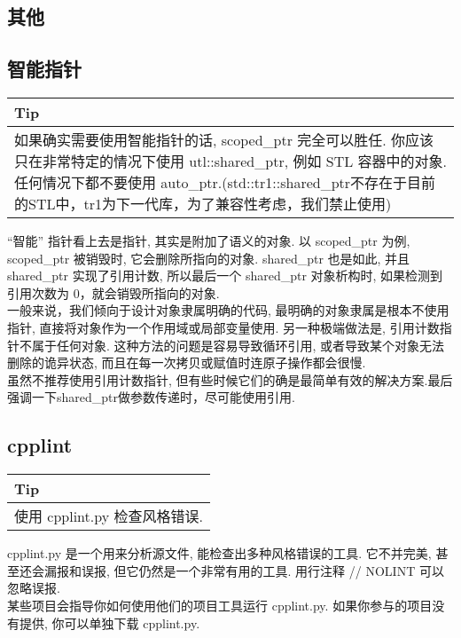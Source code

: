 \documentclass[a4paper,11pt,CJK]{article}
\begin{document}
\begin{CJK}{UTF8}{gbsn}
\newpage

\section{其他}
\subsection{智能指针}
\begin{table}[htbp]
\flushleft
\begin{tabular}{p{400pt}}
\toprule
\rowcolor[gray]{.8} Tip \\
\midrule
如果确实需要使用智能指针的话, scoped\_ptr 完全可以胜任. 你应该只在非常特定的情况下使用 utl::shared\_ptr, 例如 STL 容器中的对象. 任何情况下都不要使用 auto\_ptr.(std::tr1::shared\_ptr不存在于目前的STL中，tr1为下一代库，为了兼容性考虑，我们禁止使用)\\
\bottomrule
\end{tabular}
\end{table}
“智能” 指针看上去是指针, 其实是附加了语义的对象. 以 scoped\_ptr 为例, scoped\_ptr 被销毁时, 它会删除所指向的对象. shared\_ptr 也是如此, 并且 shared\_ptr 实现了引用计数, 所以最后一个 shared\_ptr 对象析构时, 如果检测到引用次数为 0，就会销毁所指向的对象.\\
一般来说，我们倾向于设计对象隶属明确的代码, 最明确的对象隶属是根本不使用指针, 直接将对象作为一个作用域或局部变量使用. 另一种极端做法是, 引用计数指针不属于任何对象. 这种方法的问题是容易导致循环引用, 或者导致某个对象无法删除的诡异状态, 而且在每一次拷贝或赋值时连原子操作都会很慢.\\
虽然不推荐使用引用计数指针, 但有些时候它们的确是最简单有效的解决方案.最后强调一下shared\_ptr做参数传递时，尽可能使用引用.

\subsection{cpplint}
\begin{table}[htbp]
\flushleft
\begin{tabular}{p{400pt}}
\toprule
\rowcolor[gray]{.8} Tip \\
\midrule
使用 cpplint.py 检查风格错误.\\
\bottomrule
\end{tabular}
\end{table}
cpplint.py 是一个用来分析源文件, 能检查出多种风格错误的工具. 它不并完美, 甚至还会漏报和误报, 但它仍然是一个非常有用的工具. 用行注释 // NOLINT 可以忽略误报.\\
某些项目会指导你如何使用他们的项目工具运行 cpplint.py. 如果你参与的项目没有提供, 你可以单独下载 cpplint.py.


\end{CJK}
\end{document}
